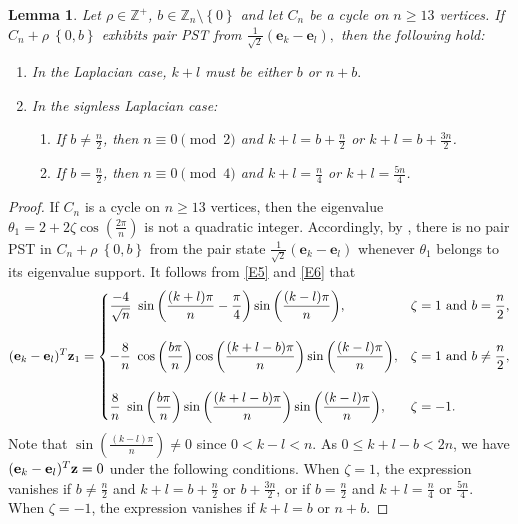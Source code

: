 \documentclass[12pt,a4paper]{article}
\newtheorem{lem}{Lemma}
\def \e {{\mathbf e}}
\def \z {{\bf z}}
\newcommand{\ob}[1]{\left(#1\right)}
\newcommand{\cb}[1]{\left\lbrace #1\right\rbrace}
\begin{document}
\begin{lem}\label{L5}
Let $\rho \in \mathbb{Z}^+$, $b \in \mathbb{Z}_n\setminus \cb{0}$ and let $C_n$ be a cycle on $n \geq 13$ vertices. If $C_n+\rho~ \cb{0,b}$ exhibits pair PST from $\frac{1}{\sqrt{2}}(\e_k-\e_l),$ then the following hold:
\begin{enumerate}
    \item In the Laplacian case, $k+l$ must be either $b$ or $n+b.$
    
    \item In the signless Laplacian case:
    \begin{enumerate}
        \item If \( b \ne \frac{n}{2} \), then \( n \equiv 0 \pmod{2} \) and \( k + l = b + \frac{n}{2} \) or \( k + l = b + \frac{3n}{2} \). \item If \( b = \frac{n}{2} \), then \( n \equiv 0 \pmod{4} \) and \( k + l = \frac{n}{4} \) or \( k + l = \frac{5n}{4} \).
    \end{enumerate}
\end{enumerate}
\end{lem}
\begin{proof}
If $C_n$ is a cycle on $n \geq 13$ vertices, then the eigenvalue $\theta_1=2+2\zeta \cos\ob{\frac{2\pi}{n}}$ is not a quadratic integer. Accordingly, by \cite[Theorem 3.2]{god25}, there is no pair PST in $C_n+\rho~ \cb{0,b}$ from the pair state $\frac{1}{\sqrt{2}}(\e_k-\e_l)$ whenever $\theta_1$ belongs to its eigenvalue support. It follows from \eqref{E5} and \eqref{E6} that
\[
(\e_k-\e_l)^T\z_1=\begin{cases}
\dfrac{-4}{\sqrt{n}}~ \sin{\left( \dfrac{(k+l)\pi}{n}-\dfrac{\pi}{4}\right)}\sin{\left( \dfrac{(k-l)\pi}{n}\right)}, & \zeta = 1 \text{~and~} b=\dfrac{n}{2}, \\ \\
-\dfrac{8}{n}~ \cos{\left( \dfrac{b\pi}{n} \right)} \cos{\left( \dfrac{(k+l-b)\pi}{n} \right)}\sin{\left( \dfrac{(k-l)\pi}{n} \right)}, & \zeta = 1 \text{~and~} b\neq \dfrac{n}{2}, \\
\\
\dfrac{8}{n}~ \sin{\left( \dfrac{b\pi}{n} \right)} \sin{\left( \dfrac{(k+l-b)\pi}{n} \right)}\sin{\left( \dfrac{(k-l)\pi}{n} \right)}, &  \zeta = -1.

\end{cases}
\]
Note that \( \sin\left( \frac{(k - l)\pi}{n} \right) \neq 0 \) since \( 0 < k - l < n \). As \( 0 \leq k + l - b < 2n \), we have \( (\e_k - \e_l)^T \z = 0 \) under the following conditions. When \( \zeta = 1 \), the expression vanishes if \( b \neq \frac{n}{2} \) and \( k + l = b + \frac{n}{2} \) or \( b + \frac{3n}{2} \), or if \( b = \frac{n}{2} \) and \( k + l = \frac{n}{4} \) or \( \frac{5n}{4} \). When \( \zeta = -1 \), the expression vanishes if \( k + l = b \) or \( n + b \).
\end{proof}
\end{document}
